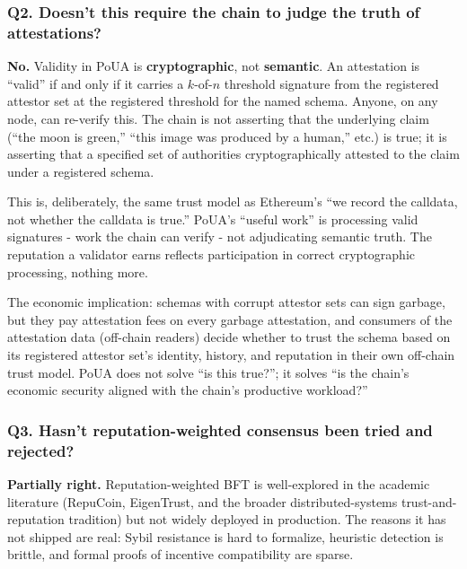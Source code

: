 \documentclass[
  11pt,
]{article}
\begin{document}
\subsubsection{Q2. Doesn't this require the chain to judge the truth of
attestations?}\label{q2.-doesnt-this-require-the-chain-to-judge-the-truth-of-attestations}

\textbf{No.} Validity in PoUA is \textbf{cryptographic}, not
\textbf{semantic}. An attestation is ``valid'' if and only if it carries
a \(k\)-of-\(n\) threshold signature from the registered attestor set at
the registered threshold for the named schema. Anyone, on any node, can
re-verify this. The chain is not asserting that the underlying claim
(``the moon is green,'' ``this image was produced by a human,'' etc.) is
true; it is asserting that a specified set of authorities
cryptographically attested to the claim under a registered schema.

This is, deliberately, the same trust model as Ethereum's ``we record
the calldata, not whether the calldata is true.'' PoUA's ``useful work''
is processing valid signatures - work the chain can verify - not
adjudicating semantic truth. The reputation a validator earns reflects
participation in correct cryptographic processing, nothing more.

The economic implication: schemas with corrupt attestor sets can sign
garbage, but they pay attestation fees on every garbage attestation, and
consumers of the attestation data (off-chain readers) decide whether to
trust the schema based on its registered attestor set's identity,
history, and reputation in their own off-chain trust model. PoUA does
not solve ``is this true?''; it solves ``is the chain's economic
security aligned with the chain's productive workload?''

\subsubsection{Q3. Hasn't reputation-weighted consensus been tried and
rejected?}\label{q3.-hasnt-reputation-weighted-consensus-been-tried-and-rejected}

\textbf{Partially right.} Reputation-weighted BFT is well-explored in
the academic literature (RepuCoin, EigenTrust, and the broader
distributed-systems trust-and-reputation tradition) but not widely
deployed in production. The reasons it has not shipped are real: Sybil
resistance is hard to formalize, heuristic detection is brittle, and
formal proofs of incentive compatibility are sparse.
\end{document}
